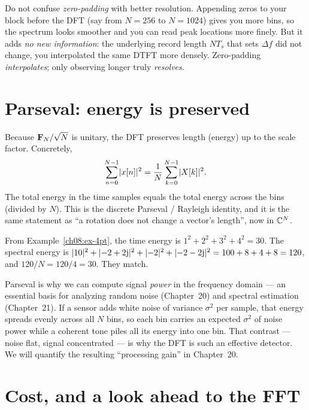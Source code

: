 \begin{trapbox}
Do not confuse \emph{zero-padding} with better resolution. Appending zeros to your
block before the DFT (say from $N=256$ to $N=1024$) gives you more bins, so the
spectrum looks smoother and you can read peak locations more finely. But it adds
\emph{no new information}: the underlying record length $NT_s$ that sets $\Delta f$
did not change, you interpolated the same DTFT more densely. Zero-padding
\emph{interpolates}; only observing longer truly \emph{resolves}.
\end{trapbox}

\section{Parseval: energy is preserved}
\label{ch08:parseval}

Because $\mathbf{F}_N/\sqrt{N}$ is unitary, the DFT preserves length (energy) up to
the scale factor. Concretely,
\[
\sum_{n=0}^{N-1} \lvert x[n]\rvert^2 = \frac{1}{N}\sum_{k=0}^{N-1} \lvert X[k]\rvert^2 .
\]
The total energy in the time samples equals the total energy across the bins
(divided by $N$). This is the discrete Parseval / Rayleigh identity, and it is the
same statement as ``a rotation does not change a vector's length'', now in $\mathbb{C}^N$.

\begin{example}
\label{ch08:ex-parseval}
From Example~\ref{ch08:ex-4pt}, the time energy is $1^2+2^2+3^2+4^2 = 30$. The
spectral energy is $\lvert10\rvert^2 + \lvert-2+2\mathrm{j}\rvert^2 + \lvert-2\rvert^2 + \lvert-2-2\mathrm{j}\rvert^2 =
100 + 8 + 4 + 8 = 120$, and $120/N = 120/4 = 30$. They match.
\end{example}

\begin{connectionbox}
Parseval is why we can compute signal \emph{power} in the frequency domain ---
an essential basis for analyzing random noise (Chapter~20) and spectral estimation (Chapter~21). If a sensor
adds white noise of variance $\sigma^2$ per sample, that energy spreads evenly
across all $N$ bins, so each bin carries an expected $\sigma^2$ of noise power
while a coherent tone piles all its energy into one bin. That contrast --- noise
flat, signal concentrated --- is why the DFT is such an effective
detector. We will quantify the resulting ``processing gain'' in Chapter~20.
\end{connectionbox}

\section{Cost, and a look ahead to the FFT}
\label{ch08:cost}

